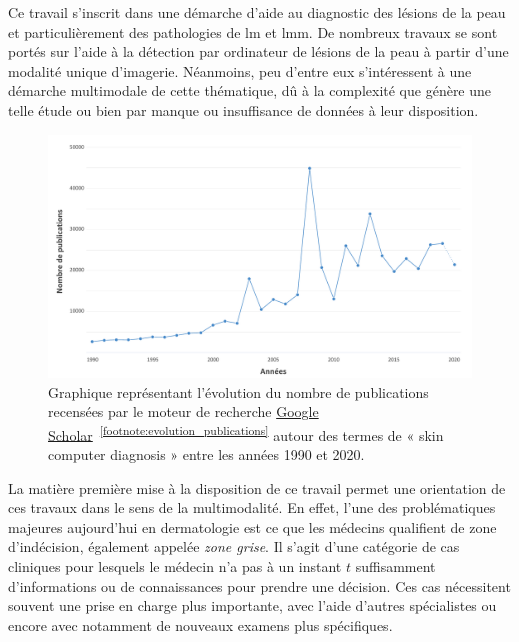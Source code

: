 Ce travail s'inscrit dans une démarche d'aide au diagnostic des lésions de la peau et particulièrement des pathologies de \gls{lm} et \gls{lmm}. De nombreux travaux se sont portés sur l'aide à la détection par ordinateur de lésions de la peau à partir d'une modalité unique d'imagerie. Néanmoins, peu d'entre eux s'intéressent à une démarche multimodale de cette thématique, dû à la complexité que génère une telle étude ou bien par manque ou insuffisance de données à leur disposition.\par

\begin{figure}[H]
    \centering
    \includegraphics[width=\linewidth]{contents/i_introduction/resources/evolution_publications.pdf}
    \caption{Graphique représentant l'évolution du nombre de publications recensées par le moteur de recherche \href{https://scholar.google.fr/}{Google Scholar}~\textsuperscript{\ref{footnote:evolution_publications}} autour des termes de « skin computer diagnosis » entre les années 1990 et 2020.}
    \label{fig:evolution_publications}
\end{figure}\par
\addtocounter{footnote}{1}

La matière première mise à la disposition de ce travail permet une orientation de ces travaux dans le sens de la multimodalité. En effet, l'une des problématiques majeures aujourd'hui en dermatologie est ce que les médecins qualifient de zone d'indécision, également appelée \textit{zone grise}. Il s'agit d'une catégorie de cas cliniques pour lesquels le médecin n'a pas à un instant $t$ suffisamment d'informations ou de connaissances pour prendre une décision. Ces cas nécessitent souvent une prise en charge plus importante, avec l'aide d'autres spécialistes ou encore avec notamment de nouveaux examens plus spécifiques.\par


